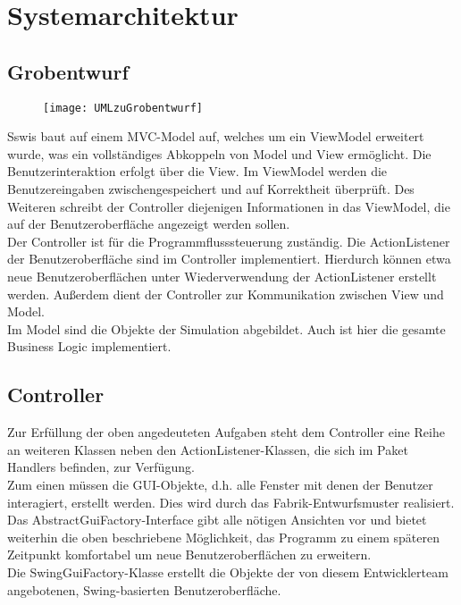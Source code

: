\section{Systemarchitektur}

\subsection{Grobentwurf}

\begin{figure}[H] 
  \centering
     \texttt{[image: UMLzuGrobentwurf]}
\end{figure}

Sswis baut auf einem MVC-Model auf, welches um ein ViewModel erweitert wurde, was ein vollständiges Abkoppeln von Model und View ermöglicht.
Die Benutzerinteraktion erfolgt über die View. Im ViewModel werden die Benutzereingaben zwischengespeichert und auf Korrektheit überprüft. Des Weiteren schreibt der Controller diejenigen Informationen in das ViewModel, die auf der Benutzeroberfläche angezeigt werden sollen.\\
Der Controller ist für die Programmflusssteuerung zuständig. Die ActionListener der Benutzeroberfläche sind im Controller implementiert. Hierdurch können etwa neue Benutzeroberflächen unter Wiederverwendung der ActionListener erstellt werden.
Außerdem dient der Controller zur Kommunikation zwischen View und Model.\\
Im Model sind die Objekte der Simulation abgebildet. Auch ist hier die gesamte Business Logic implementiert.

\subsection{Controller}

\noindent
{}

Zur Erfüllung der oben angedeuteten Aufgaben steht dem Controller eine Reihe an weiteren Klassen neben den ActionListener-Klassen, die sich im Paket Handlers befinden, zur Verfügung.\\
Zum einen müssen die GUI-Objekte, d.h. alle Fenster mit denen der Benutzer interagiert, erstellt werden. Dies wird durch das Fabrik-Entwurfsmuster realisiert. Das AbstractGuiFactory-Interface gibt alle nötigen Ansichten vor und bietet weiterhin die oben beschriebene Möglichkeit, das Programm zu einem späteren Zeitpunkt komfortabel um neue Benutzeroberflächen zu erweitern.\\
Die SwingGuiFactory-Klasse erstellt die Objekte der von diesem Entwicklerteam angebotenen, Swing-basierten Benutzeroberfläche.

